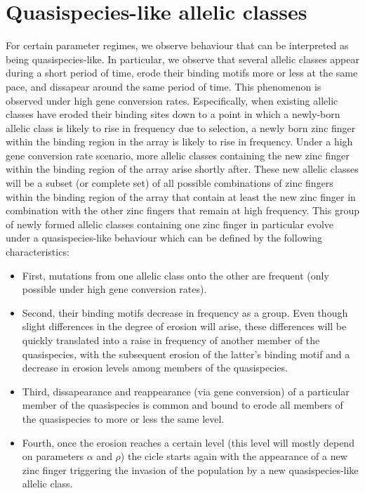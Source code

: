 \documentclass[a4paper,10pt]{article}
\begin{document}
\section{Quasispecies-like allelic classes}
\label{section_Quasispecies}
For certain parameter regimes, we observe behaviour that can be interpreted as being quasispecies-like. In particular, we observe that several allelic classes appear during a short period of time, erode their binding motifs more or less at the same pace, and dissapear around the same period of time. This phenomenon is observed under high gene conversion rates. Especifically, when existing allelic classes have eroded their binding sites down to a point in which a newly-born allelic class is likely to rise in frequency due to selection, a newly born zinc finger within the binding region in the array is likely to rise in frequency. Under a high gene conversion rate scenario, more allelic classes containing the new zinc finger within the binding region of the array arise shortly after. These new allelic classes will be a subset (or complete set) of all possible combinations of zinc fingers within the binding region of the array that contain at least the new zinc finger in combination with the other zinc fingers that remain at high frequency. This group of newly formed allelic classes containing one zinc finger in particular evolve under a quasispecies-like behaviour which can be defined by the following characteristics:
\begin{itemize}
 \item First, mutations from one allelic class onto the other are frequent (only possible under high gene conversion rates).
 \item Second, their binding motifs decrease in frequency as a group. Even though slight differences in the degree of erosion will arise, these differences will be quickly translated into a raise in frequency of another member of the quasispecies, with the subsequent erosion of the latter's binding motif and a decrease in erosion levels among members of the quasispecies.
 \item Third, dissapearance and reappearance (via gene conversion) of a particular member of the quasispecies is common and bound to erode all members of the quasispecies to more or less the same level. 
 \item Fourth, once the erosion reaches a certain level (this level will mostly depend on parameters $\alpha$ and $\rho$) the cicle starts again with the appearance of a new zinc finger triggering the invasion of the population by a new quasispecies-like allelic class.
\end{itemize}
\end{document}
